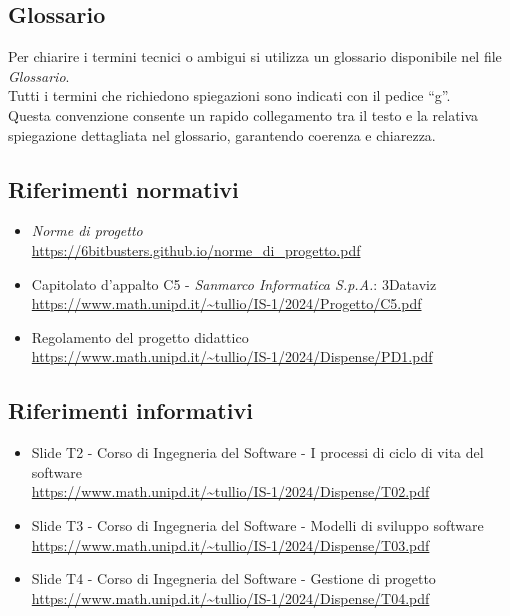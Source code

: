 \subsection{Glossario}
Per chiarire i termini tecnici o ambigui si utilizza un glossario disponibile nel file \textit{Glossario}.\\
Tutti i termini che richiedono spiegazioni sono indicati con il pedice “g”. \\
Questa convenzione consente un rapido collegamento tra il testo e la relativa spiegazione dettagliata nel glossario, garantendo coerenza e chiarezza.

\subsection{Riferimenti normativi}
\begin{itemize}
      \item \textit{Norme di progetto} \\ \url{https://6bitbusters.github.io/norme_di_progetto.pdf}
      \item Capitolato d'appalto C5 - \textit{Sanmarco Informatica S.p.A.}: 3Dataviz \\ \url{https://www.math.unipd.it/~tullio/IS-1/2024/Progetto/C5.pdf}
      \item Regolamento del progetto didattico \\ \url{https://www.math.unipd.it/~tullio/IS-1/2024/Dispense/PD1.pdf}
\end{itemize}
\subsection{Riferimenti informativi}
\begin{itemize}
      \item Slide T2 - Corso di Ingegneria del Software - I processi di ciclo di vita del software\\ \url{https://www.math.unipd.it/~tullio/IS-1/2024/Dispense/T02.pdf}
      \item Slide T3 - Corso di Ingegneria del Software - Modelli di sviluppo software \\ \url{https://www.math.unipd.it/~tullio/IS-1/2024/Dispense/T03.pdf}
      \item Slide T4 - Corso di Ingegneria del Software - Gestione di progetto \\ \url{https://www.math.unipd.it/~tullio/IS-1/2024/Dispense/T04.pdf}
\end{itemize}
